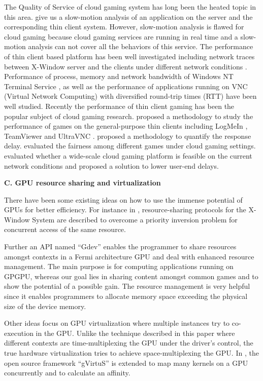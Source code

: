 \documentclass[pageno]{jpaper}
\begin{document}
The Quality of Service of cloud gaming system has long been the heated topic in this area. \cite{related20} \cite{related26} give us a slow-motion analysis of an application on the server and the corresponding thin client system. However, slow-motion analysis is flawed for cloud gaming because cloud gaming services are running in real time and a slow-motion analysis can not cover all the behaviors of this service. The performance of thin client based platform has been well investigated including network traces between X-Window server and the clients under different network conditions \cite{related30}. Performance of process, memory and network bandwidth of Windows NT Terminal Service \cite{related43}, as well as the performance of applications running on VNC (Virtual Network Computing) with diversified round-trip times (RTT) \cite{related37} have been well studied. Recently the performance of thin client gaming has been the popular subject of cloud gaming research. \cite{related4} proposed a methodology to study the performance of games on the general-purpose thin clients including LogMeIn \cite{related24}, TeamViewer \cite{related36} and UltraVNC \cite{related38}. \cite{related5} proposed a methodology to quantify the response delay. \cite{related22} evaluated the fairness among different games under cloud gaming settings. \cite{related7} evaluated whether a wide-scale cloud gaming platform is feasible on the current network conditions and proposed a solution to lower user-end delays.


\noindent \textbf{C. GPU resource sharing and virtualization}

There have been some existing ideas on how to use the immense potential of GPUs for better efficiency.
For instance in \cite{gdevpaper}, resource-sharing protocols for the
X-Window System are described to overcome a priority inversion problem for
concurrent access of the same resource.

Further an API named ``Gdev'' \cite{gdevpaper} enables the programmer to
share resources amongst contexts in a Fermi architecture GPU and deal with
enhanced resource management. The main purpose is for computing applications running on GPGPU, whereas our goal
lies in sharing content amongst common games and to show the potential of a
possible gain. The resource management is very helpful since it enables programmers to allocate memory space exceeding the physical size of
the device memory.

Other ideas focus on GPU virtualization where multiple instances try to co-execution in the GPU. Unlike the technique described in this paper where different contexts are time-multiplexing the GPU under the driver's control, the true hardware virtualization tries to achieve space-multiplexing the GPU. In \cite{gpucloudsharing},
the open source framework ``gVirtuS'' \cite{Giunta} is extended to map many
kernels on a GPU concurrently and to calculate an affinity.
\end{document}
